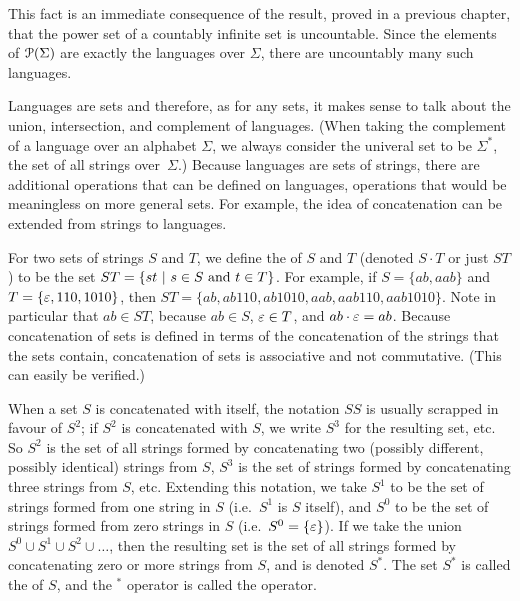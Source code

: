 \smallskip
This fact is an immediate consequence of the result, proved in a previous
chapter, that the power set of a countably infinite set is uncountable.  Since
the elements of ${\cal P}(\Sigma)$ are exactly the languages over $\Sigma$,
there are uncountably many such languages.

\medskip

Languages are sets and therefore, as for any sets, it makes sense to talk about
the union, intersection, and complement of languages.  (When taking the complement
of a language over an alphabet $\Sigma$, we always consider the univeral set
to be $\Sigma^*$, the set of all strings over~$\Sigma$.)
Because languages are
sets of strings, there are additional operations that can be defined on
languages, operations that would be meaningless on more general sets.  For
example, the idea of concatenation can be extended from strings to languages.

For two sets of strings $S$ and $T$, we define the  of $S$ and
$T$ (denoted $S\cdot T$ 
or just $ST$) to
be the set $ST = \{ st \ | \ s \in S \text{ and } t \in T \}$.  For example, if $S =
\{ab, aab\}$ and $T=\{\varepsilon, 110, 1010\}$, then 
$ST = \{ab,  ab110,  ab1010,  aab,  aab110,  aab1010\}$.  
Note in particular that $ab \in ST$, because $ab \in S$, $\varepsilon \in T$, and
$ab \cdot \varepsilon = ab$.
Because 
concatenation of sets is defined in terms of the
concatenation of the
strings that the sets contain, concatenation of sets is associative
and not commutative.  (This can easily be verified.)  

When a set $S$
is concatenated with itself, the notation $SS$ is usually scrapped
in favour of $S^2$; if $S^2$ is concatenated with $S$, we write
$S^3$ for the resulting set, etc.  So $S^2$ is the set of all strings formed by
concatenating two (possibly different, possibly identical) strings from $S$,
$S^3$ is the set of strings formed by concatenating three strings from $S$,
etc.  Extending this notation, we take $S^1$ to be the set of strings formed
from one string in $S$ (i.e.\ $S^1$ is $S$ itself), and $S^0$ to be the set of
strings formed from zero strings in $S$ (i.e.\ $S^0 = \{\varepsilon\}$).  If we take
the union $S^0 \cup S^1 \cup S^2 \cup \ldots$, then the resulting set is the set of
all strings formed by concatenating zero or more strings from $S$, and is
denoted $S^*$.  The set $S^*$ is called the  of $S$, and
the $^*$ operator is called the  operator.

\smallskip

